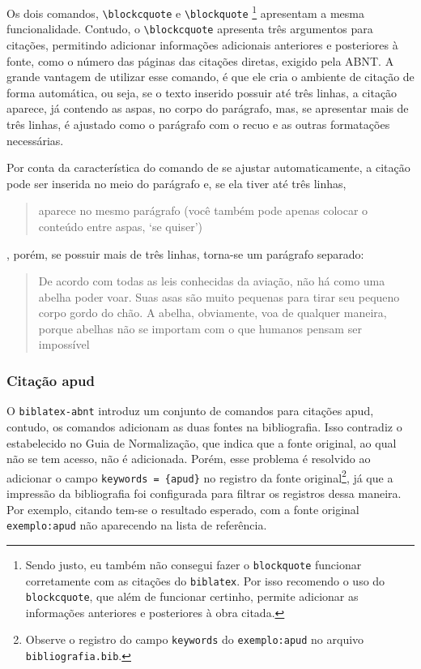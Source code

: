 Os dois comandos, \verb|\blockcquote| e \verb|\blockquote|%
\footnote{Sendo justo, eu também não consegui fazer o \texttt{blockquote} funcionar corretamente com as citações do \texttt{biblatex}. Por isso recomendo o uso do \texttt{blockcquote}, que além de funcionar certinho, permite adicionar as informações anteriores e posteriores à obra citada.} 
apresentam a mesma funcionalidade. Contudo, o \verb|\blockcquote| apresenta três argumentos para citações, permitindo adicionar informações adicionais anteriores e posteriores à fonte, como o número das páginas das citações diretas, exigido pela ABNT. A grande vantagem de utilizar esse comando, é que ele cria o ambiente de citação de forma automática, ou seja, se o texto inserido possuir até três linhas, a citação aparece, já contendo as aspas, no corpo do parágrafo, mas, se apresentar mais de três linhas, é ajustado como o parágrafo com o recuo e as outras formatações necessárias.

Por conta da característica do comando de se ajustar automaticamente, a citação pode ser inserida no meio do parágrafo e, se ela tiver até três linhas, \blockcquote{batman}{aparece no mesmo parágrafo (você também pode apenas colocar o conteúdo entre aspas, `se quiser')}, porém, se possuir mais de três linhas, torna-se um parágrafo separado:
\blockcquote[tradução nossa]{filme:bee-movie}{De acordo com todas as leis conhecidas da aviação, não há como uma abelha poder voar. Suas asas são muito pequenas para tirar seu pequeno corpo gordo do chão. A abelha, obviamente, voa de qualquer maneira, porque abelhas não se importam com o que humanos pensam ser impossível}

\subsubsection{Citação apud}
O \texttt{biblatex-abnt} introduz um conjunto de comandos para citações apud, contudo, os comandos adicionam as duas fontes na bibliografia. Isso contradiz o estabelecido no Guia de Normalização, que indica que a fonte original, ao qual não se tem acesso, não é adicionada. Porém, esse problema é resolvido ao adicionar o campo \verb|keywords = {apud}| no registro da fonte original\footnote{Observe o registro do campo \texttt{keywords} do \texttt{exemplo:apud} no arquivo \texttt{bibliografia.bib}.}, já que a impressão da bibliografia foi configurada para filtrar os registros dessa maneira. Por exemplo, citando tem-se o resultado esperado, com a fonte original \texttt{exemplo:apud} não aparecendo na lista de referência.

